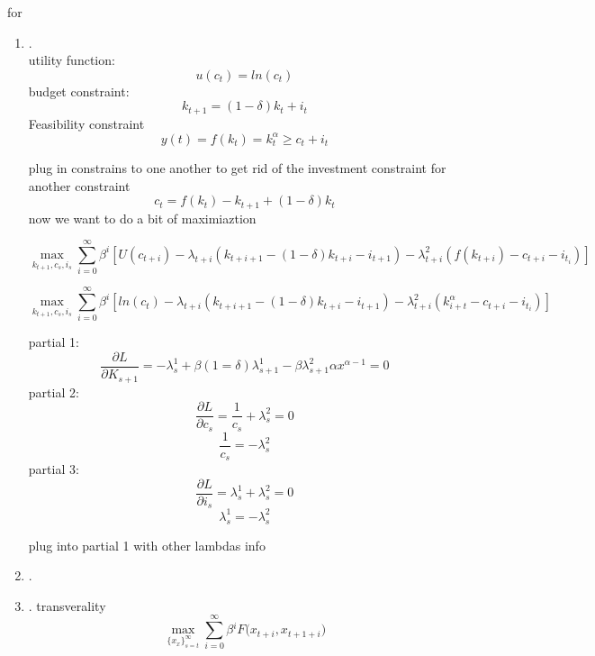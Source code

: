
for\begin{enumerate}
    \item .\\
    utility function: $$u(c_t)=ln(c_t)$$
    budget constraint:$$k_{t+1}=(1-\delta)k_t+i_t$$ 
    Feasibility constraint $$ y(t)=f(k_t)=k^\alpha _t\geq c_t+i_t$$
    
plug in constrains to one another to get rid of the investment constraint for another constraint
$$c_t=f(k_t)-k_{t+1}+(1-\delta)k_t$$
now we want to do a bit of maximiaztion

$$\max_{k_{t+1},c_s,i_s} \sum^\infty_{i=0}\beta^i[U(c_{t+i})-\lambda_{t+i}(k_{t+i+1}-(1-\delta)k_{t+i}-i_{t+1})-\lambda^2_{t+i}(f(k_{t+i})-c_{t+i}-i_{t_i})]$$

$$\max_{k_{t+1},c_s,i_s} \sum^\infty_{i=0}\beta^i[ln(c_t)-\lambda_{t+i}(k_{t+i+1}-(1-\delta)k_{t+i}-i_{t+1})-\lambda^2_{t+i}(k_{i+t}^\alpha-c_{t+i}-i_{t_i})]$$

partial 1:
$$\frac{\partial L}{\partial K_{s+1}}= -\lambda^1_s+\beta(1=\delta)\lambda^1_{s+1}-\beta\lambda^2_{s+1}\alpha x^{\alpha-1}=0$$
partial 2:
$$\frac{\partial L}{\partial c_s}= \frac{1}{c_s}+\lambda^2_s=0$$
$$\frac{1}{c_s}=-\lambda^2_s$$
partial 3:
$$\frac{\partial L}{\partial i_s}= \lambda^1_s+\lambda^2_s=0$$
$$ \lambda^1_s=-  \lambda^2_s$$

plug into partial 1 with other lambdas info
\item .
\item. transverality 
$$\max_{\{x_x\}^\infty_{s=t}}\sum^\infty_{i=0}\beta{^iF(x_{t+i},x_{t+1+i}})$$
\end{enumerate}